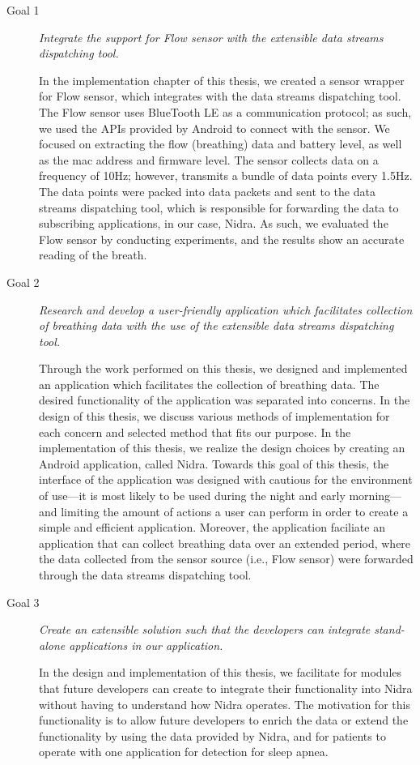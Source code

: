 \begin{description}
    \item[Goal 1] \textit{Integrate the support for Flow sensor with the extensible data streams dispatching tool.}

    In the implementation chapter of this thesis, we created a sensor wrapper for Flow sensor, which integrates with the data streams dispatching tool. The Flow sensor uses BlueTooth LE as a communication protocol; as such, we used the APIs provided by Android to connect with the sensor. We focused on extracting the flow (breathing) data and battery level, as well as the mac address and firmware level. The sensor collects data on a frequency of 10Hz; however, transmits a bundle of data points every 1.5Hz. The data points were packed into data packets and sent to the data streams dispatching tool, which is responsible for forwarding the data to subscribing applications, in our case, Nidra. As such, we evaluated the Flow sensor by conducting experiments, and the results show an accurate reading of the breath. 

    \item[Goal 2] \textit{Research and develop a user-friendly application which facilitates collection of breathing data with the use of the extensible data streams dispatching tool.}


    Through the work performed on this thesis, we designed and implemented an application which facilitates the collection of breathing data. The desired functionality of the application was separated into concerns. In the design of this thesis, we discuss various methods of implementation for each concern and selected method that fits our purpose.  In the implementation of this thesis, we realize the design choices by creating an Android application, called Nidra. Towards this goal of this thesis, the interface of the application was designed with cautious for the environment of use---it is most likely to be used during the night and early morning---and limiting the amount of actions a user can perform in order to create a simple and efficient application. Moreover, the application faciliate an application that can collect breathing data over an extended period, where the data collected from the sensor source (i.e., Flow sensor) were forwarded through the data streams dispatching tool. 


    \item[Goal 3] \textit{Create an extensible solution such that the developers can integrate stand-alone applications in our application.}

    In the design and implementation of this thesis, we facilitate for modules that future developers can create to integrate their functionality into Nidra without having to understand how Nidra operates. The motivation for this functionality is to allow future developers to enrich the data or extend the functionality by using the data provided by Nidra, and for patients to operate with one application for detection for sleep apnea. 
\end{description}


